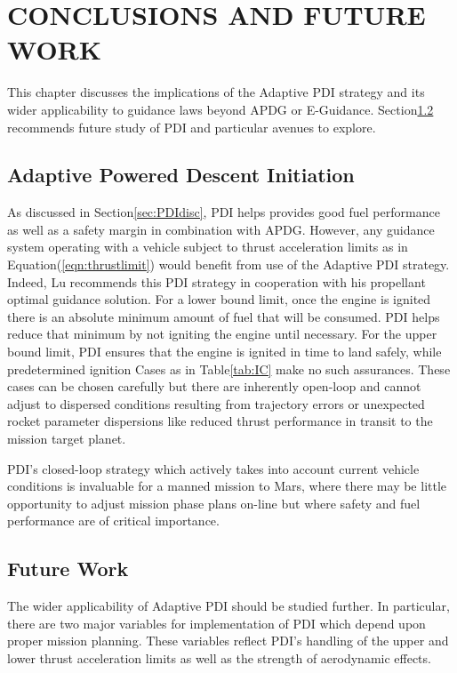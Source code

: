 \chapter{CONCLUSIONS AND FUTURE WORK} \label{chap:conclusions}
This chapter discusses the implications of the Adaptive PDI strategy and its wider applicability to guidance laws beyond APDG or E-Guidance. Section\:\ref{sec:futurework} recommends future study of PDI and particular avenues to explore.

\section{Adaptive Powered Descent Initiation}
As discussed in Section\:\ref{sec:PDIdisc}, PDI helps provides good fuel performance as well as a safety margin in combination with APDG. However, any guidance system operating with a vehicle subject to thrust acceleration limits as in Equation\:(\ref{eqn:thrustlimit}) would benefit from use of the Adaptive PDI strategy. Indeed, Lu recommends this PDI strategy in cooperation with his propellant optimal guidance solution\:\cite{LU}. For a lower bound limit, once the engine is ignited there is an absolute minimum amount of fuel that will be consumed. PDI helps reduce that minimum by not igniting the engine until necessary. For the upper bound limit, PDI ensures that the engine is ignited in time to land safely, while predetermined ignition Cases as in Table\:\ref{tab:IC} make no such assurances. These cases can be chosen carefully but there are inherently open-loop and cannot adjust to dispersed conditions resulting from trajectory errors or unexpected rocket parameter dispersions like reduced thrust performance in transit to the mission target planet.

PDI's closed-loop strategy which actively takes into account current vehicle conditions is invaluable for a manned mission to Mars, where there may be little opportunity to adjust mission phase plans on-line but where safety and fuel performance are of critical importance. 



\section{Future Work} \label{sec:futurework}

The wider applicability of Adaptive PDI should be studied further. In particular, there are two major variables for implementation of PDI which depend upon proper mission planning. These variables reflect PDI's handling of the upper and lower thrust acceleration limits as well as the strength of aerodynamic effects.

